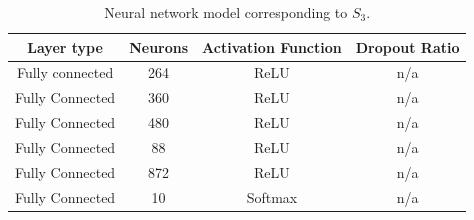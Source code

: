 \documentclass[journal]{IEEEtran}
\begin{document}
\begin{table}[!htb]
\begin{center}
\begin{tabular}{| c | c | c | c |}
\hline
Layer type & Neurons & Activation Function & Dropout Ratio \\
\hline
Fully connected & 264 & ReLU & n/a \\
Fully Connected & 360 & ReLU & n/a\\
Fully Connected & 480 & ReLU & n/a\\
Fully Connected & 88 & ReLU & n/a\\
Fully Connected & 872 & ReLU & n/a\\
Fully Connected & 10 & Softmax & n/a\\
\hline
\end{tabular}
\end{center}
\caption{Neural network model corresponding to $S_3$.}
\label{table:neural_network_model_S3}
\end{table}

\end{document}
